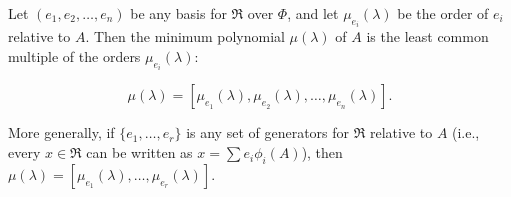 Let $(e_1, e_2, \dots, e_n)$ be any basis for $\Re$ over $\Phi$, and let $\mu_{e_i}(\lambda)$ be the order of $e_i$ relative to $A$. Then the minimum polynomial $\mu(\lambda)$ of $A$ is the least common multiple of the orders $\mu_{e_i}(\lambda)$:

$$\mu(\lambda) = [\mu_{e_1}(\lambda), \mu_{e_2}(\lambda), \dots, \mu_{e_n}(\lambda)].$$

More generally, if $\{e_1, \dots, e_r\}$ is any set of generators for $\Re$ relative to $A$ (i.e., every $x \in \Re$ can be written as $x = \sum e_i \phi_i(A)$), then $\mu(\lambda) = [\mu_{e_1}(\lambda), \dots, \mu_{e_r}(\lambda)]$.
